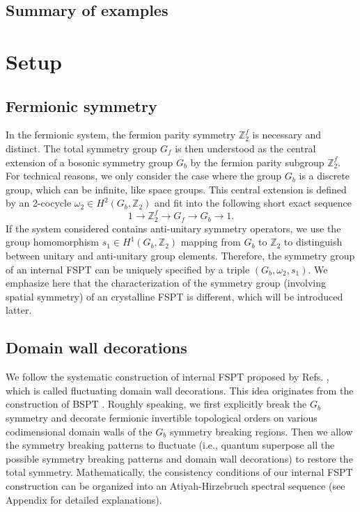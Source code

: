 \documentclass[%
 reprint,
 amsmath,amssymb,
 aps,
prb,
]{revtex4-2}
\begin{document}
\subsection{Summary of examples}

\section{Setup}

\subsection{Fermionic symmetry}
In the fermionic system, the fermion parity symmetry $\mathbb Z_{2}^{f}$ is necessary and distinct.
The total symmetry group $G_{f}$ is then understood as the central extension of a bosonic symmetry group $G_{b}$ by the fermion parity subgroup $\mathbb Z_{2}^{f}$.
For technical reasons, we only consider the case where the group $G_{b}$ is a discrete group, which can be infinite, like space groups.
This central extension is defined by an 2-cocycle $\omega_2 \in H^2(G_b, \mathbb Z_2)$ and fit into the following short exact sequence 
\begin{equation}
1 \rightarrow \mathbb Z_{2}^{f} \rightarrow G_{f} \rightarrow G_{b} \rightarrow 1.
\end{equation}
If the system considered contains anti-unitary symmetry operators, we use the group homomorphism $s_{1} \in H^1(G_b, \mathbb Z_2)$ mapping from $G_{b}$ to $\mathbb Z_{2}$ to distinguish between unitary and anti-unitary group elements. 
Therefore, the symmetry group of an internal FSPT can be uniquely specified by a triple $(G_b, \omega_2, s_1)$.
We emphasize here that the characterization of the symmetry group (involving spatial symmetry) of an crystalline FSPT is different, which will be introduced latter.


\subsection{Domain wall decorations}
We follow the systematic construction of internal FSPT 
proposed by Refs. \cite{Wang2018,Wang2020}, which is called fluctuating domain wall decorations.
This idea originates from the construction of BSPT \cite{Chen2014}.
Roughly speaking, we first explicitly break the $G_{b}$ symmetry and decorate fermionic invertible topological orders on various codimensional domain walls of the $G_{b}$ symmetry breaking regions.
Then we allow the symmetry breaking patterns to fluctuate (i.e., quantum superpose all the possible symmetry breaking patterns and domain wall decorations) to restore the total symmetry. 
Mathematically, the consistency conditions of our internal FSPT construction can be organized into an Atiyah-Hirzebruch spectral sequence \cite{wang2021domain, Gaiotto2019} (see Appendix for detailed explanations).
\end{document}
